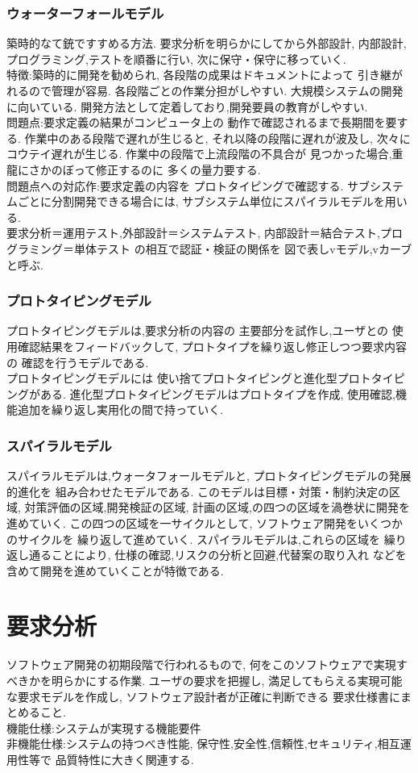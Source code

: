 \documentclass[8pt,twocolumn]{jsarticle}
\begin{document}
\subsubsection{ウォーターフォールモデル}
築時的なて銃ですすめる方法.
要求分析を明らかにしてから外部設計,
内部設計,プログラミング,テストを順番に行い,
次に保守・保守に移っていく.\\
特徴:築時的に開発を勧められ,
各段階の成果はドキュメントによって
引き継がれるので管理が容易.
各段階ごとの作業分担がしやすい.
大規模システムの開発に向いている.
開発方法として定着しており,開発要員の教育がしやすい.\\
問題点:要求定義の結果がコンピュータ上の
動作で確認されるまで長期間を要する.
作業中のある段階で遅れが生じると,
それ以降の段階に遅れが波及し,
次々にコウテイ遅れが生じる.
作業中の段階で上流段階の不具合が
見つかった場合,重龍にさかのぼって修正するのに
多くの量力要する.\\
問題点への対応作:要求定義の内容を
プロトタイピングで確認する.
サブシステムごとに分割開発できる場合には,
サブシステム単位にスパイラルモデルを用いる.\\
要求分析＝運用テスト,外部設計＝システムテスト,
内部設計＝結合テスト,プログラミング＝単体テスト
の相互で認証・検証の関係を
図で表しvモデル,vカーブと呼ぶ.
\subsubsection{プロトタイピングモデル}
プロトタイピングモデルは,要求分析の内容の
主要部分を試作し,ユーザとの
使用確認結果をフィードバックして,
プロトタイプを繰り返し修正しつつ要求内容の
確認を行うモデルである.\\
プロトタイピングモデルには
使い捨てプロトタイピングと進化型プロトタイピングがある.
進化型プロトタイピングモデルはプロトタイプを作成,
使用確認,機能追加を繰り返し実用化の間で持っていく.
\subsubsection{スパイラルモデル}
スパイラルモデルは,ウォータフォールモデルと,
プロトタイピングモデルの発展的進化を
組み合わせたモデルである.
このモデルは目標・対策・制約決定の区域,
対策評価の区域,開発検証の区域,
計画の区域,の四つの区域を渦巻状に開発を進めていく.
この四つの区域を一サイクルとして,
ソフトウェア開発をいくつかのサイクルを
繰り返して進めていく.
スパイラルモデルは,これらの区域を
繰り返し通ることにより,
仕様の確認,リスクの分析と回避,代替案の取り入れ
などを含めて開発を進めていくことが特徴である.
\section{要求分析}
ソフトウェア開発の初期段階で行われるもので,
何をこのソフトウェアで実現すべきかを明らかにする作業.
ユーザの要求を把握し,
満足してもらえる実現可能な要求モデルを作成し,
ソフトウェア設計者が正確に判断できる
要求仕様書にまとめること.\\
機能仕様:システムが実現する機能要件\\
非機能仕様:システムの持つべき性能,
保守性,安全性,信頼性,セキュリティ,相互運用性等で
品質特性に大きく関連する.
\end{document}

